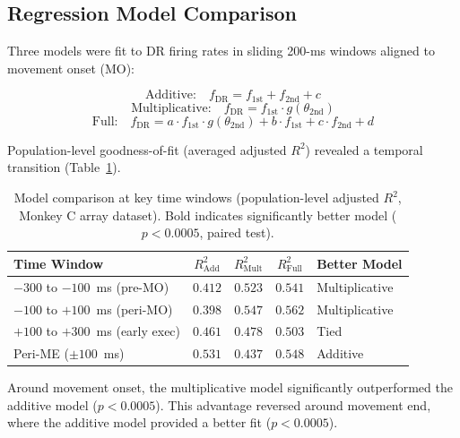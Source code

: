 \documentclass[11pt]{article}
\begin{document}
\subsection{Regression Model Comparison}

Three models were fit to DR firing rates in sliding 200-ms windows aligned to movement onset (MO):

\begin{equation}
\text{Additive:} \quad f_\text{DR} = f_{1\text{st}} + f_{2\text{nd}} + c
\end{equation}
\begin{equation}
\text{Multiplicative:} \quad f_\text{DR} = f_{1\text{st}} \cdot g(\theta_{2\text{nd}})
\end{equation}
\begin{equation}
\text{Full:} \quad f_\text{DR} = a \cdot f_{1\text{st}} \cdot g(\theta_{2\text{nd}}) + b \cdot f_{1\text{st}} + c \cdot f_{2\text{nd}} + d
\end{equation}

Population-level goodness-of-fit (averaged adjusted $R^2$) revealed a temporal transition (Table~\ref{tab:model_fit}).

\begin{table}[H]
\centering
\caption{Model comparison at key time windows (population-level adjusted $R^2$, Monkey C array dataset). Bold indicates significantly better model ($p < 0.0005$, paired test).}
\label{tab:model_fit}
\begin{tabular}{@{}lcccl@{}}
\toprule
Time Window & $R^2_\text{Add}$ & $R^2_\text{Mult}$ & $R^2_\text{Full}$ & Better Model \\
\midrule
$-300$ to $-100$~ms (pre-MO) & $0.412$ & $\mathbf{0.523}$ & $0.541$ & Multiplicative \\
$-100$ to $+100$~ms (peri-MO) & $0.398$ & $\mathbf{0.547}$ & $0.562$ & Multiplicative \\
$+100$ to $+300$~ms (early exec) & $0.461$ & $0.478$ & $0.503$ & Tied \\
Peri-ME ($\pm 100$~ms) & $\mathbf{0.531}$ & $0.437$ & $0.548$ & Additive \\
\bottomrule
\end{tabular}
\end{table}

Around movement onset, the multiplicative model significantly outperformed the additive model ($p < 0.0005$). This advantage reversed around movement end, where the additive model provided a better fit ($p < 0.0005$).
\end{document}
